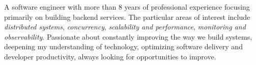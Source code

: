 

\begin{cvparagraph}

	A software engineer with more than 8 years of professional experience focusing primarily on building backend services. The particular areas of interest include {\textit{distributed systems}}, {\textit{concurrency}}, {\textit{scalability and performance}}, {\textit{monitoring and observability}}. Passionate about constantly improving the way we build systems, deepening my understanding of technology, optimizing software delivery and developer productivity, always looking for opportunities to improve.

\end{cvparagraph}
